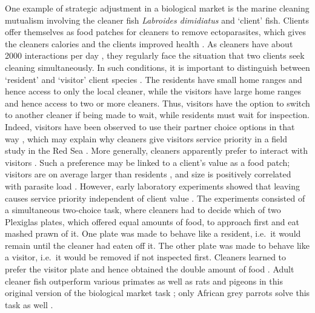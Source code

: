 \documentclass[]{rsos}%
\begin{document}
One example of strategic adjustment in a biological market is the marine
cleaning mutualism involving the cleaner fish \emph{Labroides dimidiatus} and
`client' fish. Clients offer themselves as food patches for cleaners to
remove ectoparasites, which gives the cleaners calories and the clients
improved health \citep{waldie_LongTerm_2011, ros_Does_2011, triki_Effects_2016}. As cleaners have about 2000
interactions per day \citep{grutter_Relationship_1995}, they regularly face
the situation that two clients seek cleaning simultaneously. In such
conditions, it is important to distinguish between `resident' and
`visitor' client species \citep{bshary_Cleaner_2001a}. The residents have
small home ranges and hence access to only the local cleaner, while the
visitors have large home ranges and hence access to two or more
cleaners. Thus, visitors have the option to switch to another cleaner if
being made to wait, while residents must wait for inspection. Indeed,
visitors have been observed to use their partner choice options in that
way \citep{bshary_Choosy_2002}, which may explain why cleaners give
visitors service priority in a field study in the Red Sea
\citep{bshary_Cleaner_2001a}. More generally, cleaners apparently prefer to
interact with visitors \citep{triki_Marine_2021}. Such a preference may be
linked to a client's value as a food patch; visitors are on average
larger than residents \citep{bshary_Cleaner_2001a}, and size is positively
correlated with parasite load \citep{grutter_Relationship_1995a}. However,
early laboratory
experiments showed that leaving causes service priority independent of
client value \citep{bshary_Asymmetric_2002}. The experiments consisted of a
simultaneous two-choice task, where cleaners had to decide which of two
Plexiglas plates, which offered equal amounts of food, to approach first
and eat mashed prawn of it. One plate was made to behave like a
resident, i.e.~it would remain until the cleaner had eaten off it. The
other plate was made to behave like a visitor, i.e.~it would be removed
if not inspected first. Cleaners learned to prefer the visitor plate and
hence obtained the double amount of food \citep{bshary_Asymmetric_2002}.
Adult cleaner fish outperform various primates as well as rats and
pigeons in this original version of the biological market task
\citep{salwiczek_Adult_2012, zentall_Early_2017}; only African grey
parrots solve this task as well \citep{pepperberg_Can_2014}.
\end{document}
